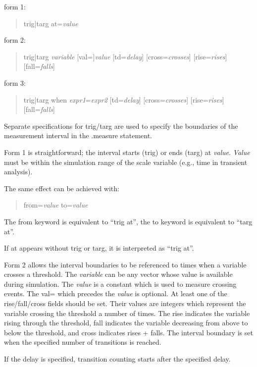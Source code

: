 form 1:
\begin{quote}\vt
    trig|targ at={\it value}
\end{quote}

form 2:
\begin{quote}\vt
    trig|targ {\it variable} [val=]{\it value}
        [td={\it delay}] [cross={\it crosses}]
        [rise={\it rises}] [fall={\it falls}]
\end{quote}

form 3:
\begin{quote}\vt
    trig|targ when {\it expr1\/}={\it expr2} [td={\it delay}]
        [cross={\it crosses}] [rise={\it rises}] [fall={\it falls}]
\end{quote}

Separate specifications for {\vt trig}/{\vt targ} are used to specify
the boundaries of the measurement interval in the {\vt .measure}
statement.

Form 1 is straightforward; the interval starts ({\vt trig}) or ends
({\vt targ}) at {\it value}.  {\it Value} must be within the
simulation range of the scale variable (e.g., time in transient
analysis).

The same effect can be achieved with:
\begin{quote}\vt
    from={\it value} to={\it value}
\end{quote}
The {\vt from} keyword is equivalent to ``{\vt trig at}'', the
{\vt to} keyword is equivalent to ``{\vt targ at}''.

If {\vt at} appears without {\vt trig} or {\vt targ}, it is
interpreted as ``{\vt trig at}''.

Form 2 allows the interval boundaries to be referenced to times when a
variable crosses a threshold.  The {\it variable} can be any vector
whose value is available during simulation.  The {\it value} is a
constant which is used to measure crossing events.  The {\vt val=}
which precedes the {\it value} is optional.  At least one of the {\vt
rise/fall/cross} fields should be set.  Their values are integers
which represent the variable crossing the threshold a number of times. 
The {\vt rise} indicates the variable rising through the threshold,
{\vt fall} indicates the variable decreasing from above to below the
threshold, and {\vt cross} indicates {\vt rises + falls}.  The
interval boundary is set when the specified number of transitions is
reached.

If the delay is specified, transition counting starts after the
specified delay.

